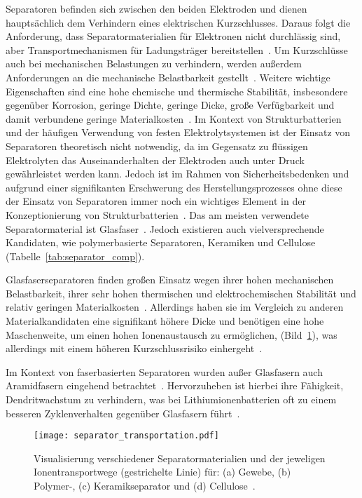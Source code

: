 Separatoren befinden sich zwischen den beiden Elektroden und dienen hauptsächlich dem Verhindern eines elektrischen Kurzschlusses. Daraus folgt die Anforderung, dass Separatormaterialien für Elektronen nicht durchlässig sind, aber Transportmechanismen für Ladungsträger bereitstellen~\cite{Kurzweil2015}. Um Kurzschlüsse auch bei mechanischen Belastungen zu verhindern, werden außerdem Anforderungen an die mechanische Belastbarkeit gestellt~\cite{Asp2015}. Weitere wichtige Eigenschaften sind eine hohe chemische und thermische Stabilität, insbesondere gegenüber Korrosion, geringe Dichte, geringe Dicke, große Verfügbarkeit und damit verbundene geringe Materialkosten~\cite{Beard2019}. Im Kontext von Strukturbatterien und der häufigen Verwendung von festen Elektrolytsystemen ist der Einsatz von Separatoren theoretisch nicht notwendig, da im Gegensatz zu flüssigen Elektrolyten das Auseinanderhalten der Elektroden auch unter Druck gewährleistet werden kann. Jedoch ist im Rahmen von Sicherheitsbedenken und aufgrund einer signifikanten Erschwerung des Herstellungsprozesses ohne diese der Einsatz von Separatoren immer noch ein wichtiges Element in der Konzeptionierung von Strukturbatterien~\cite{Asp2015, Hubert2022}. Das am meisten verwendete Separatormaterial ist Glasfaser~\cite{Zhou2022}. Jedoch existieren auch vielversprechende Kandidaten, wie polymerbasierte Separatoren, Keramiken und Cellulose~\cite{Simon2008, Greenhalgh2023, Chaudhary2024a} (Tabelle~\ref{tab:separator_comp}).



Glasfaserseparatoren finden großen Einsatz wegen ihrer hohen mechanischen Belastbarkeit, ihrer sehr hohen thermischen und elektrochemischen Stabilität und relativ geringen Materialkosten~\cite{Luo2015,Asp2019,Asp2021,Liu2022}. Allerdings haben sie im Vergleich zu anderen Materialkandidaten eine signifikant höhere Dicke und benötigen eine hohe Maschenweite, um einen hohen Ionenaustausch zu ermöglichen, (Bild~\ref{fig:separator_transportation}), was allerdings mit einem höheren Kurzschlussrisiko einhergeht~\cite{Danzi2021,Zhou2022}. 

Im Kontext von faserbasierten Separatoren wurden außer Glasfasern auch Aramidfasern eingehend betrachtet~\cite{Jin2023}. Hervorzuheben ist hierbei ihre Fähigkeit, Dendritwachstum zu verhindern, was bei Lithiumionenbatterien oft zu einem besseren Zyklenverhalten gegenüber Glasfasern führt~\cite{Tung2015,Wang2021a}.

\begin{figure}[ht]
        \center
	\texttt{[image: separator\_transportation.pdf]}
		\caption{\label{fig:separator_transportation}Visualisierung verschiedener Separatormaterialien und der jeweligen Ionentransportwege (gestrichelte Linie) für: (a) Gewebe, (b) Polymer-, (c) Keramikseparator und (d) Cellulose~\cite{Zschiebsch2024}.}
\end{figure}


